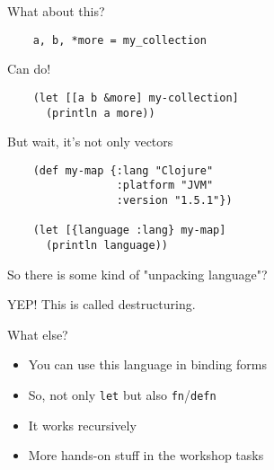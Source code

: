 \begin{frame}[fragile]
  \begin{center}
    What about this?
  \end{center}
  \pause
  \begin{verbatim}
    a, b, *more = my_collection
  \end{verbatim}
\end{frame}

\begin{frame}[fragile]
  \begin{center}
    Can do!
  \end{center}
  \begin{verbatim}
    (let [[a b &more] my-collection]
      (println a more))
  \end{verbatim}
\end{frame}

\begin{frame}[fragile]
  \begin{center}
    But wait, it's not only vectors
  \end{center}
  \begin{verbatim}
    (def my-map {:lang "Clojure"
                 :platform "JVM"
                 :version "1.5.1"})

    (let [{language :lang} my-map]
      (println language))
  \end{verbatim}
\end{frame}

\begin{frame}
  \begin{center}
    So there is some kind of "unpacking language"?

    \pause
    YEP! This is called destructuring.
  \end{center}
\end{frame}

\begin{frame}
  What else?

  \begin{itemize}
    \item You can use this language in binding forms
    \item So, not only \texttt{let} but also \texttt{fn}/\texttt{defn}
    \item It works recursively
    \item More hands-on stuff in the workshop tasks
  \end{itemize}
\end{frame}


